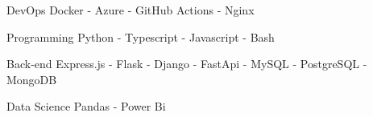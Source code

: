 

\begin{cvskills}

  \cvskill
    {DevOps} %
    {Docker - Azure - GitHub Actions - Nginx} %

  \cvskill
    {Programming} %
    {Python - Typescript - Javascript - Bash} %

  \cvskill
    {Back-end} %
    {Express.js - Flask - Django - FastApi -  MySQL - PostgreSQL - MongoDB} %

  \cvskill
    {Data Science} %
    {Pandas - Power Bi} %

\end{cvskills}
